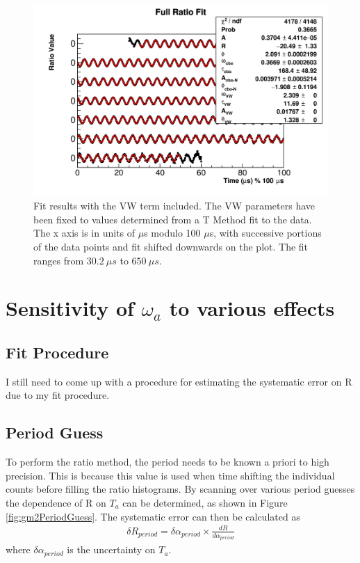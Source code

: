 	\begin{figure}[]
		\centering
		\includegraphics[width=\textwidth]{ratioCBO_moduloPlot-VW}
	    \caption[VWModuloPlot]{Fit results with the VW term included. The VW parameters have been fixed to values determined from a T Method fit to the data. The x axis is in units of $\mu$s modulo 100 $\mu$s, with successive portions of the data points and fit shifted downwards on the plot. The fit ranges from $\SI{30.2}{\mu s}$ to $\SI{650}{\mu s}$.}
	    \label{fig:VWModuloPlot}
	\end{figure}



\section{Sensitivity of \texorpdfstring{$\omega_{a}$}{} to various effects}

	\subsection{Fit Procedure}

		I still need to come up with a procedure for estimating the systematic error on R due to my fit procedure.

	\subsection{\gmtwo Period Guess}
	\label{SubSec:gm2Guess}

		To perform the ratio method, the \gmtwo period needs to be known a priori to high precision. This is because this value is used when time shifting the individual counts before filling the ratio histograms. By scanning over various \gmtwo period guesses the dependence of R on $T_{a}$ can be determined, as shown in Figure \ref{fig:gm2PeriodGuess}. The systematic error can then be calculated as 
			\begin{align}
				\delta R_{period} = \delta\alpha_{period} \times \frac{dR}{d\alpha_{period}}
			\end{align}
		where $\delta\alpha_{period}$ is the uncertainty on $T_{a}$. 


